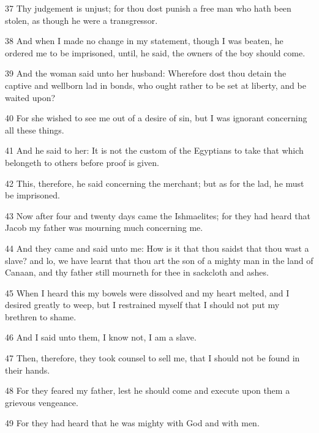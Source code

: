 \par 37 Thy judgement is unjust; for thou dost punish a free man who hath been stolen, as though he were a transgressor.

\par 38 And when I made no change in my statement, though I was beaten, he ordered me to be imprisoned, until, he said, the owners of the boy should come.

\par 39 And the woman said unto her husband: Wherefore dost thou detain the captive and wellborn lad in bonds, who ought rather to be set at liberty, and be waited upon?

\par 40 For she wished to see me out of a desire of sin, but I was ignorant concerning all these things.

\par 41 And he said to her: It is not the custom of the Egyptians to take that which belongeth to others before proof is given.

\par 42 This, therefore, he said concerning the merchant; but as for the lad, he must be imprisoned.

\par 43 Now after four and twenty days came the Ishmaelites; for they had heard that Jacob my father was mourning much concerning me.

\par 44 And they came and said unto me: How is it that thou saidst that thou wast a slave? and lo, we have learnt that thou art the son of a mighty man in the land of Canaan, and thy father still mourneth for thee in sackcloth and ashes.

\par 45 When I heard this my bowels were dissolved and my heart melted, and I desired greatly to weep, but I restrained myself that I should not put my brethren to shame.

\par 46 And I said unto them, I know not, I am a slave.

\par 47 Then, therefore, they took counsel to sell me, that I should not be found in their hands.

\par 48 For they feared my father, lest he should come and execute upon them a grievous vengeance.

\par 49 For they had heard that he was mighty with God and with men.

